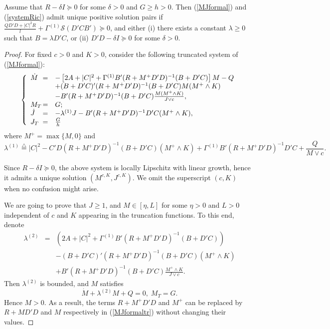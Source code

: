 \documentclass[final]{siamltex}
\begin{document}
\begin{theorem}\label{exisMJformal}
Assume that $R-\delta I\succeq 0$ for some $\delta>0$ and $G\ge h>0$.
Then  
(\ref{MJformal}) and (\ref{systemRic}) admit  unique positive solution pairs
 if $\frac{QD'D+|C|^2R}{l}+\Gamma^{(1)}{{\mathcal S}}(D'CB' )\succeq 0$, and
 either (i) there exists a constant $\lambda\ge 0$ such that $B=\lambda D'C$,  or (ii) $D'D-\delta I\succeq 0$ for some $\delta>0$.
\end{theorem}

\begin{proof} For fixed $c>0$ and $K>0$, consider the following truncated system of (\ref{MJformal}):
\begin{equation}\label{MJformaltr}
\left\{\begin{array}{lll}
\dot{M}\hspace{-0.3cm}&=&- \left[2A+|C|^2+\Gamma^{(1)} B'(R+M^+D'D)^{-1}(B+D'C)\right] M-Q\\
&&+(B+D'C)'(R+M^+D'D)^{-1}(B+D'C)M(M^+\wedge K)\\
&&-B'(R+M^+D'D)^{-1}(B+D'C)\frac{M(M^+\wedge K)}{J\vee c},\\
M_T\hspace{-0.3cm}&=&G;\\
\dot{J}\hspace{-0.3cm}&=&-\lambda^{(1)} J -B'(R+M^+D'D)^{-1}D'C (M^+\wedge K),\\
 J_T\hspace{-0.3cm}&=&\frac{G}{h}\\
\end{array}\right.
\end{equation}
where $M^+=\max\{M, 0\}$ and
$$\lambda^{(1)}{\stackrel{\triangle}{=}} |C|^2- C'D(R+M^+D'D)^{-1}(B+D'C)(M^+\wedge K)+ \Gamma^{(1)} B'(R+M^+D'D)^{-1}D'C+\frac{Q}{M\vee c}.$$

Since $R-\delta I\succeq 0$, the above system is locally Lipschitz with linear growth,
hence it admits a unique solution $(M^{c,K}, J^{c,K})$. We omit the superscript
$(c, K)$ when no confusion might arise.

We are going to prove that $J\ge 1$, and $M\in [\eta, L]$ for some $\eta>0$ and $L>0$
independent of $c$ and $K$ appearing in the truncation functions.
To this end, denote
\begin{eqnarray*}
\lambda^{(2)}&=& (2A+|C|^2+\Gamma^{(1)} B'(R+M^+D'D)^{-1}(B+D'C))\\
&&-(B+D'C)'(R+M^+D'D)^{-1}(B+D'C)(M^+\wedge K)\\
&&   +B'(R+M^+D'D)^{-1}(B+D'C)\frac{M^+\wedge K}{J\vee c}.
\end{eqnarray*}
 Then $\lambda^{(2)}$ is bounded, and $M$ satisfies
\begin{equation} \label{linearM}
  \dot M+\lambda^{(2)} M+Q=0,\; M_T=G.
\end{equation}
Hence $M>0$. As a result, the terms $R+M^+D'D$ and $M^+$ can be
replaced by $R+MD'D$ and $M$ respectively in (\ref{MJformaltr}) without changing their values.


\end{proof}
\end{document}
